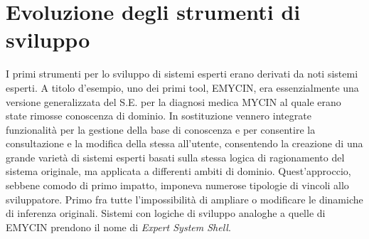 \section{Evoluzione degli strumenti di sviluppo}
I primi strumenti per lo sviluppo di sistemi esperti erano derivati da noti sistemi esperti. A titolo d'esempio, uno dei primi tool, EMYCIN, era essenzialmente una versione generalizzata del S.E. per la diagnosi medica MYCIN al quale erano state rimosse conoscenza di dominio. In sostituzione vennero integrate funzionalità per la gestione della base di conoscenza e per consentire la consultazione e la modifica della stessa all'utente, consentendo la creazione di una grande varietà di sistemi esperti basati sulla stessa logica di ragionamento del sistema originale, ma applicata a differenti ambiti di dominio. Quest'approccio, sebbene comodo di primo impatto, imponeva numerose tipologie di vincoli allo sviluppatore. Primo fra tutte l'impossibilità di ampliare o modificare le dinamiche di inferenza originali. Sistemi con logiche di sviluppo analoghe a quelle di EMYCIN prendono il nome di \emph{Expert System Shell}.



